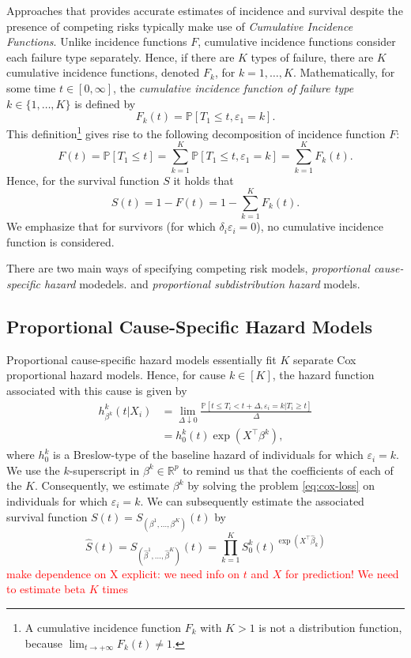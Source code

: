 \documentclass[11pt]{article}
\renewcommand{\P}{\mathbb{P}}
\newcommand{\R}{\mathbb{R}}
\begin{document}
Approaches that provides accurate estimates of incidence and survival despite the presence of competing risks typically make use of \textit{Cumulative Incidence Functions}. Unlike incidence functions $F$, cumulative incidence functions consider each failure type separately. Hence, if there are $K$ types of failure, there are $K$ cumulative incidence functions, denoted $F_k$, for $k=1,\dots,K$. Mathematically, for some time $t\in[0,\infty]$, the \textit{cumulative incidence function of failure type} $k\in\{1,\dots,K\}$ is defined by
\[
    F_k(t) = \P[T_1 \leq t , \varepsilon_1 = k].
\]
This definition\footnote{A cumulative incidence function $F_k$ with $K>1$ is not a distribution function, because $\lim_{t\to+\infty}F_k(t) \neq 1$.} gives rise to the following decomposition of incidence function $F$:
\[
    F(t) = \P[T_1 \leq t] = \sum_{k=1}^K \P[T_1 \leq t, \varepsilon_1 = k] = \sum_{k=1}^K F_k(t).
\]
Hence, for the survival function $S$ it holds that
\[
    S(t) = 1 - F(t) = 1 -  \sum_{k=1}^K F_k(t).
\]
We emphasize that for survivors (for which $\delta_i\varepsilon_i=0$), no cumulative incidence function is considered.  

There are two main ways of specifying competing risk models, \textit{proportional cause-specific hazard} modedels. and \textit{proportional subdistribution hazard} models.

\subsection{Proportional Cause-Specific Hazard Models}
Proportional cause-specific hazard models essentially fit $K$ separate Cox proportional hazard models. Hence, for cause $k\in[K]$, the hazard function associated with this cause is given by
\begin{equation*}
\begin{split}
     h^k_{\beta^k}(t|X_i) &= \lim_{\Delta \downarrow 0}\frac{\P[t \leq T_i < t + \Delta, \varepsilon_i = k | T_i \geq t]}{\Delta} 
     \\ &=
     h_0^k (t) \exp (X^\top \beta^k),
\end{split}
\end{equation*}
where $h_0^k$ is a Breslow-type of the baseline hazard of individuals for which $\varepsilon_i = k$. We use the $k$-superscript in $\beta^k \in \R^p$ to remind us that the coefficients of each of the $K$. Consequently, we estimate $\beta^k$ by solving the problem \eqref{eq:cox-loss} on individuals for which $\varepsilon_i = k$. We can subsequently estimate the associated survival function $S(t) = S_{(\beta^1,\dots,\beta^K)}(t)$ by
\[
    \hat{S}(t) = S_{(\hat{\beta}^1,\dots,\hat{\beta}^K)}(t)
    =
    \prod_{k=1}^K
    S_0^k(t)^{\exp(X^\top\widehat{\beta}_k)}
\]
\textcolor{red}{make dependence on X explicit: we need info on $t$ and $X$ for prediction! We need to estimate beta $K$ times}


\end{document}
